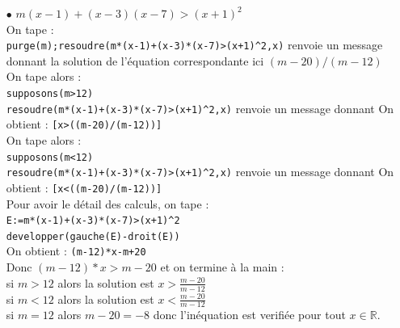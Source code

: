 \documentclass[a4paper,11pt]{book}
\newcommand{\R}{{\mathbb{R}}}
\begin{document}
\begin{enumerate}
\begin{itemize}
{\tt resoudre(m*(x-3)>x+2,x)}\\
On obtient : {\tt [x>((3*m+2)/(m-1))]}\\
On tape :\\
{\tt supposons(m<1);}\\
{\tt resoudre(m*(x-3)>x+2,x)}\\
On obtient : {\tt [x<((3*m+2)/(m-1))]}\\
Pour avoir le d\'etail des calculs, on tape :\\
{\tt E:=m*(x-3)>x+2}\\
{\tt developper(gauche(E)-droit(E))}\\
On obtient : {\tt (m-1)*x-3*m-2}\\
Donc $(m-1)*x>3*m+2$ et on termine \`a la main :\\
si $m>1$ alors la solution est $\displaystyle x>\frac{3*m+2}{m-1}$\\
si $m<1$ alors la solution est $\displaystyle x<\frac{3*m+2}{m-1}$\\
si $m=1$  alors $3*m+2=5$ donc il n'y a pas de solution.

\item[$\bullet$] $m(x-1)+(x-3)(x-7)>(x+1)^2$\\
On tape :\\
{\tt purge(m);resoudre(m*(x-1)+(x-3)*(x-7)>(x+1)\verb|^|2,x)} renvoie un 
message donnant
la solution de l'\'equation correspondante ici $(m-20)/(m-12)$\\
On tape alors :\\
{\tt supposons(m>12)}\\
{\tt resoudre(m*(x-1)+(x-3)*(x-7)>(x+1)\verb|^|2,x)} renvoie un message donnant
On obtient : {\tt [x>((m-20)/(m-12))]}\\
On tape alors :\\
{\tt supposons(m<12)}\\
{\tt resoudre(m*(x-1)+(x-3)*(x-7)>(x+1)\verb|^|2,x)} renvoie un message donnant
On obtient : {\tt [x<((m-20)/(m-12))]}\\
Pour avoir le d\'etail des calculs, on tape :\\
{\tt E:=m*(x-1)+(x-3)*(x-7)>(x+1)\verb|^|2}\\
{\tt developper(gauche(E)-droit(E))}\\
On obtient : {\tt (m-12)*x-m+20}\\
Donc $(m-12)*x>m-20$ et on termine \`a la main :\\
si $m>12$ alors la solution est $\displaystyle x>\frac{m-20}{m-12}$\\
si $m<12$ alors la solution est $\displaystyle x<\frac{m-20}{m-12}$\\
si $m=12$  alors $m-20=-8$ donc l'in\'equation est verifi\'ee pour tout 
$x \in \R$.
\end{itemize}
\end{enumerate}
\end{document}
